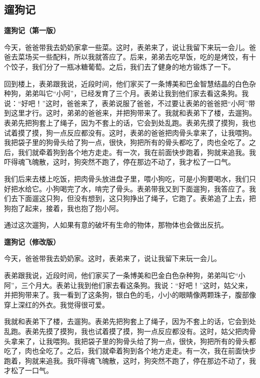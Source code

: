 \documentclass[UTF8,a4paper,titlepage,twoside,10.5pt]{article}
\begin{document}
\subsection{遛狗记}
\label{sec:org9e2b95d}

\textbf{遛狗记（第一版）}

今天，爸爸带我去奶奶家拿一些菜。这时，表弟来了，说让我留下来玩一会儿。爸爸去菜场买一些配料，所以我就答应了。后来，弟弟去吃早饭，吃的是烤饺，有十个饺子，我们分了一瓶冰糖葡萄。之后，我们去了健身的地方锻炼了一下。

回到楼上，表弟跟我说，近段时间，他们家买了一条博美和巴金智慧结晶的白色杂种狗，弟弟叫它“小阿”，已经发育了三个月。表弟让我到他们家去看这条狗。我说：“好吧！”这时，爸爸来了，表弟说服了爸爸，不过要让表弟的爸爸把“小阿”带到这里才行。这时，弟弟的爸爸来，并把狗带来了。我就和表弟下了楼，去遛狗。表弟先把狗套上了绳子，因为不套上的话，它会到处乱跑。表弟先摸了摸狗，我也试着摸了摸，狗一点反应都没有。这时，表弟的爸爸把肉骨头拿来了，让我喂狗。我把袋子里的狗骨头给了狗一点，很快，狗把所有的骨头都吃了，肉也全吃了。之后，我们就牵着狗到各个地方走走。有一次，我在前面快步跑着，狗就来追我。我吓得魂飞魄散，这时，狗突然不跑了，停在那边不动了，我才松了一口气。

我们后来去楼上吃饭，把肉骨头放进盘子里，喂小狗吃，可是小狗要喝水，我们只好把水给它。小狗喝完了水，啃完了骨头。表弟带我又到下面遛狗，我答应了。我们去下面遛这只狗，但没有想到，这只狗挣出了绳子，它跑了。表弟追了上去，把狗抱了起来，接着，我也抱了抱小阿。

通过这次遛狗，人如果有意的破坏有生命的物体，那物体也会做出反抗。

\vspace*{\baselineskip}

\textbf{遛狗记（修改版）}

今天，爸爸带我去奶奶家。这时，表弟来了，说让我留下来玩一会儿。

表弟跟我说，近段时间，他们家买了一条博美和巴金白色杂种狗，弟弟叫它“小阿”，三个月大。表弟让我到他们家去看这条狗。我说：“好吧！”这时，姑父来，并把狗带来了。我一看到了这条狗，银白色的毛，小小的眼睛像两颗珠子，腹部像穿上深红的外衣。我觉得很可爱。

我就和表弟下了楼，去遛狗。表弟先把狗套上了绳子，因为不套上的话，它会到处乱跑。表弟先摸了摸狗，我也试着摸了摸，狗一点反应都没有。这时，姑父把肉骨头拿来了，让我喂狗。我把袋子里的狗骨头给了狗一点，很快，狗把所有的骨头都吃了，肉也全吃了。之后，我们就牵着狗到各个地方走走。有一次，我在前面快步跑着，狗就来追我。我吓得魂飞魄散，这时，狗突然不跑了，停在那边不动了，我才松了一口气。
\end{document}
